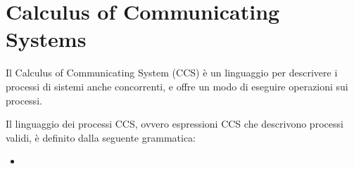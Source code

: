 \chapter{Calculus of Communicating Systems}
Il Calculus of Communicating System (CCS) è un linguaggio per descrivere i processi di sistemi anche concorrenti, e offre un modo di eseguire operazioni sui processi.

Il linguaggio dei processi CCS, ovvero espressioni CCS che descrivono processi validi, è definito dalla seguente grammatica:
\begin{itemize}
    \item 
\end{itemize}